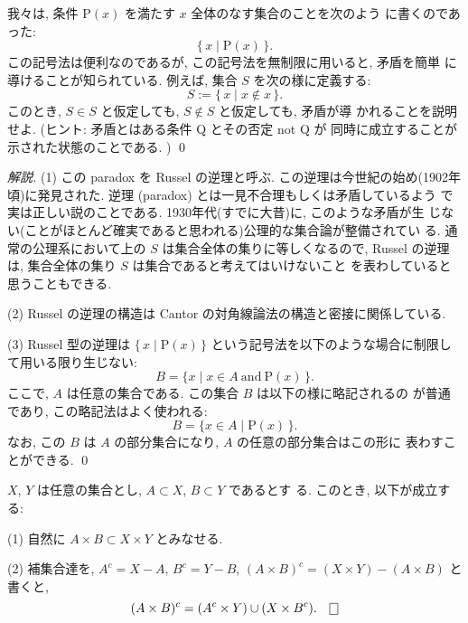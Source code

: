 \documentclass[12pt,twoside]{jarticle}
\begin{document}

\begin{question}[10点]
我々は, 条件 $\text{P}(x)$ を満たす $x$ 全体のなす集合のことを次のよう
に書くのであった:
\[
  \{\, x \mid \text{P}(x) \,\}.
\]
この記号法は便利なのであるが, この記号法を無制限に用いると, 矛盾を簡単
に導けることが知られている. 例えば, 集合 $S$ を次の様に定義する:
\[
  S := \{\, x \mid x \notin x \,\}.
\]
このとき, $S \in S$ と仮定しても, $S \notin S$ と仮定しても, 矛盾が導
かれることを説明せよ. (ヒント: 矛盾とはある条件 Q とその否定 not Q が
同時に成立することが示された状態のことである. )
\qed
\end{question}

\begin{proof}[解説]
(1) この paradox を Russel の逆理と呼ぶ. この逆理は今世紀の始め(1902年
頃)に発見された. 逆理 (paradox) とは一見不合理もしくは矛盾しているよう
で実は正しい説のことである. 1930年代(すでに大昔)に, このような矛盾が生
じない(ことがほとんど確実であると思われる)公理的な集合論が整備されてい
る. 通常の公理系において上の $S$ は集合全体の集りに等しくなるので, 
Russel の逆理は, 集合全体の集り $S$ は集合であると考えてはいけないこと
を表わしていると思うこともできる. 
\par\noindent
(2) Russel の逆理の構造は Cantor の対角線論法の構造と密接に関係している. 
\par\noindent
(3) Russel 型の逆理は
\( \{\, x \mid \text{P}(x) \,\} \)
という記号法を以下のような場合に制限して用いる限り生じない:
\[
  B = \{ x \mid x \in A\ \text{and}\ \text{P}(x) \,\}.
\]
ここで, $A$ は任意の集合である. この集合 $B$ は以下の様に略記されるの
が普通であり, この略記法はよく使われる:
\[
  B = \{ x \in A \mid \text{P}(x) \,\}.
\]
なお, この $B$ は $A$ の部分集合になり, $A$ の任意の部分集合はこの形に
表わすことができる. 
\qed 
\end{proof}


\begin{question}[10点]
$X$, $Y$ は任意の集合とし, $A \subset X$, $B \subset Y$ であるとす
る. このとき, 以下が成立する:

\par\noindent
(1) 自然に
\( A \times B \subset X \times Y \)
とみなせる. 

\par\noindent
(2) 補集合達を, 
\( A^c = X - A \),
\( B^c = Y - B \),
\( (A \times B)^c = (X \times Y) - (A \times B) \)
と書くと, 
\[
  (A \times B)^c = (A^c \times Y) \cup (X \times B^c).
  \qed
\]
\end{question}
\end{document}
